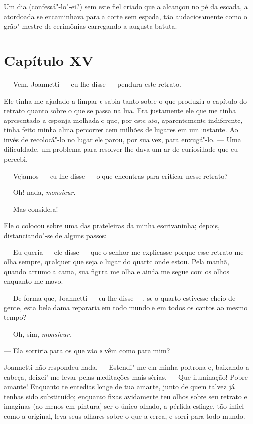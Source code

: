 Um dia (confessá"-lo"-ei?) sem este fiel criado que a alcançou no pé da
escada, a atordoada se encaminhava para a corte sem espada, tão
audaciosamente como o grão"-mestre de cerimônias carregando a augusta
batuta.

\section*{Capítulo XV}

 --- Vem, Joannetti --- eu lhe disse --- pendura este retrato.

 Ele tinha me ajudado a limpar e sabia tanto sobre o que produziu o
capítulo do retrato quanto sobre o que se passa na lua. Era justamente
ele que me tinha apresentado a esponja molhada e que, por este ato,
aparentemente indiferente, tinha feito minha alma percorrer cem milhões
de lugares em um instante. Ao invés de recolocá"-lo no lugar ele parou,
por sua vez, para enxugá"-lo. --- Uma dificuldade, um problema para
resolver lhe dava um ar de curiosidade que eu percebi. 

 --- Vejamos --- eu lhe disse --- o que encontras para criticar nesse
retrato?

 --- Oh! nada, \textit{monsieur}. 

--- Mas considera!

Ele o colocou sobre uma das prateleiras da minha escrivaninha; depois,
distanciando"-se de alguns passos:

--- Eu queria --- ele disse --- que o senhor me explicasse porque esse
retrato me olha sempre, qualquer que seja o lugar do quarto onde estou.
Pela manhã, quando arrumo a cama, sua figura me olha e ainda me segue
com os olhos enquanto me movo.

--- De forma que, Joannetti --- eu lhe disse ---, se o quarto estivesse
cheio de gente, esta bela dama repararia em todo mundo e em todos os
cantos ao mesmo tempo? 

--- Oh, sim, \textit{monsieur}.

--- Ela sorriria para os que vão e vêm como para mim?

Joannetti não respondeu nada. --- Estendi"-me em minha poltrona e,
baixando a cabeça, deixei"-me levar pelas meditações mais sérias. ---
Que iluminação! Pobre amante! Enquanto te entedias longe de tua amante,
junto de quem talvez já tenhas sido substituído; enquanto fixas
avidamente teu olhos sobre seu retrato e imaginas (ao menos em pintura)
ser o único olhado, a pérfida esfinge, tão infiel como a original, leva
seus olhares sobre o que a cerca, e sorri para todo mundo. 

